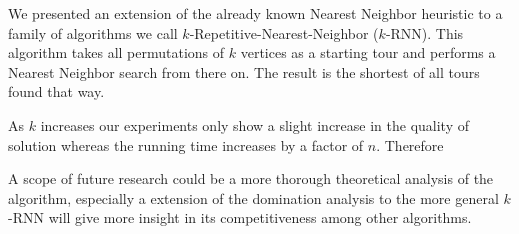 \documentclass[11pt]{article}
\begin{document}
	We presented an extension of the already known Nearest Neighbor heuristic to a family of algorithms we call $k$-Repetitive-Nearest-Neighbor ($k$-RNN). 
	This algorithm takes all permutations of $k$ vertices as a starting tour and performs a Nearest Neighbor search from there on. 
	The result is the shortest of all tours found that way.
	
	As $k$ increases our experiments only show a slight increase in the quality of solution whereas the running time increases by a factor of $n$.
	Therefore
	
	A scope of future research could be a more thorough theoretical analysis of the algorithm, especially a extension of the domination analysis to the more general $k$-RNN will give more insight in its competitiveness among other algorithms. 

	
	
	
	
\end{document}
